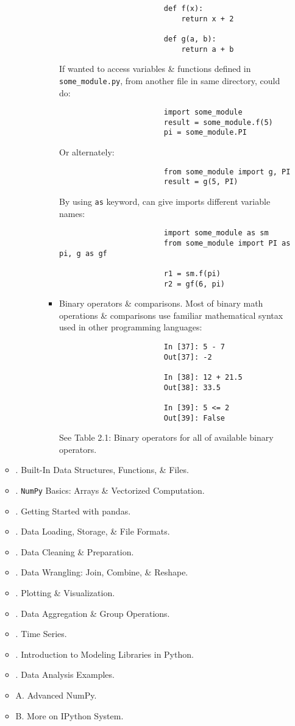 \documentclass{article}
\begin{document}
\begin{enumerate}
\begin{itemize}
\begin{itemize}
\begin{itemize}
\begin{itemize}
\begin{verbatim}
						def f(x):
						    return x + 2
						    
						def g(a, b):
						    return a + b
					\end{verbatim}
					If wanted to access variables \& functions defined in \verb|some_module.py|, from another file in same directory, could do:
					\begin{verbatim}
						import some_module
						result = some_module.f(5)
						pi = some_module.PI
					\end{verbatim}
					Or alternately:
					\begin{verbatim}
						from some_module import g, PI
						result = g(5, PI)
					\end{verbatim}
					By using {\tt as} keyword, can give imports different variable names:
					\begin{verbatim}
						import some_module as sm
						from some_module import PI as pi, g as gf
						
						r1 = sm.f(pi)
						r2 = gf(6, pi)
					\end{verbatim}
					\item {\sf Binary operators \& comparisons.} Most of binary math operations \& comparisons use familiar mathematical syntax used in other programming languages:
					\begin{verbatim}
						In [37]: 5 - 7
						Out[37]: -2
						
						In [38]: 12 + 21.5
						Out[38]: 33.5
						
						In [39]: 5 <= 2
						Out[39]: False
					\end{verbatim}
					See {\sf Table 2.1: Binary operators} for all of available binary operators.
				\end{itemize}
			\end{itemize}
		\end{itemize}
		\item {. Built-In Data Structures, Functions, \& Files.}
		\item {. {\tt NumPy} Basics: Arrays \& Vectorized Computation.}
		\item {. Getting Started with pandas.}
		\item {. Data Loading, Storage, \& File Formats.}
		\item {. Data Cleaning \& Preparation.}
		\item {. Data Wrangling: Join, Combine, \& Reshape.}
		\item {. Plotting \& Visualization.}
		\item {. Data Aggregation \& Group Operations.}
		\item {. Time Series.}
		\item {. Introduction to Modeling Libraries in Python.}
		\item {. Data Analysis Examples.}
		\item {\sf A. Advanced NumPy.}
		\item {\sf B. More on IPython System.}
	\end{itemize}	
\end{enumerate}
\end{document}

